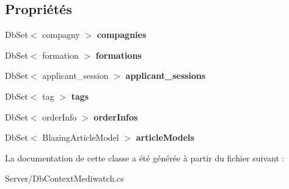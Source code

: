 \subsection*{Propriétés}
\begin{DoxyCompactItemize}
\item 
\mbox{\label{class_server_1_1_db_context_mediwatch_a068d9222b8448c069c2d181a9f577d0c}} 
Db\+Set$<$ compagny $>$ {\bfseries compagnies}
\item 
\mbox{\label{class_server_1_1_db_context_mediwatch_a6597dab2848cd5aa87774af4bf6eb4e4}} 
Db\+Set$<$ formation $>$ {\bfseries formations}
\item 
\mbox{\label{class_server_1_1_db_context_mediwatch_aea8aaf9d1c1f27f64a2a488f41c531b2}} 
Db\+Set$<$ applicant\+\_\+session $>$ {\bfseries applicant\+\_\+sessions}
\item 
\mbox{\label{class_server_1_1_db_context_mediwatch_a0bcaba8827c3d82857deb35923f6dcef}} 
Db\+Set$<$ tag $>$ {\bfseries tags}
\item 
\mbox{\label{class_server_1_1_db_context_mediwatch_a852541740bc368d71f6816d4e4c3be86}} 
Db\+Set$<$ order\+Info $>$ {\bfseries order\+Infos}
\item 
\mbox{\label{class_server_1_1_db_context_mediwatch_a298accc740bb1638718fe4664b41e800}} 
Db\+Set$<$ Blazing\+Article\+Model $>$ {\bfseries article\+Models}
\end{DoxyCompactItemize}


La documentation de cette classe a été générée à partir du fichier suivant \+:\begin{DoxyCompactItemize}
\item 
Server/Db\+Context\+Mediwatch.\+cs\end{DoxyCompactItemize}
